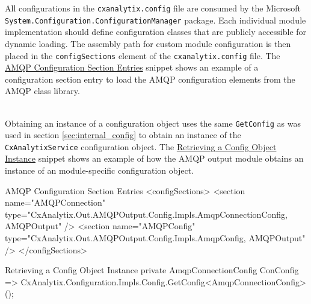 All configurations in the \texttt{cxanalytix.config} file are consumed by the Microsoft\\ 
\texttt{System.Configuration.ConfigurationManager} package.
Each individual module implementation should define configuration classes that are publicly accessible for dynamic loading.
The assembly path for custom module configuration is then placed in the \texttt{configSections} element of the \texttt{cxanalytix.config}
file.  The \hyperref[lst:config_sections]{AMQP Configuration Section Entries} snippet shows an example of a configuration section entry to load the AMQP configuration elements
from the AMQP class library.

\noindent\\Obtaining an instance of a configuration object uses the same \texttt{GetConfig} as was used in section \ref{sec:internal_config}
to obtain an instance of the \texttt{CxAnalytixService} configuration object.  The \hyperref[lst:amqp_config]{Retrieving a Config Object Instance} snippet 
shows an example of how the AMQP output module obtains an instance of an module-specific configuration object.\\

\begin{code}{AMQP Configuration Section Entries}{\label{lst:config_sections}}{}
<configSections>
    <section name="AMQPConnection" 
        type="CxAnalytix.Out.AMQPOutput.Config.Impls.AmqpConnectionConfig, AMQPOutput"
        />
    <section name="AMQPConfig" 
        type="CxAnalytix.Out.AMQPOutput.Config.Impls.AmqpConfig, AMQPOutput"
        />
</configSections>
\end{code}


\begin{code}{Retrieving a Config Object Instance}{\label{lst:amqp_config}}{}
private AmqpConnectionConfig ConConfig =>
    CxAnalytix.Configuration.Impls.Config.GetConfig<AmqpConnectionConfig>();
\end{code}
    